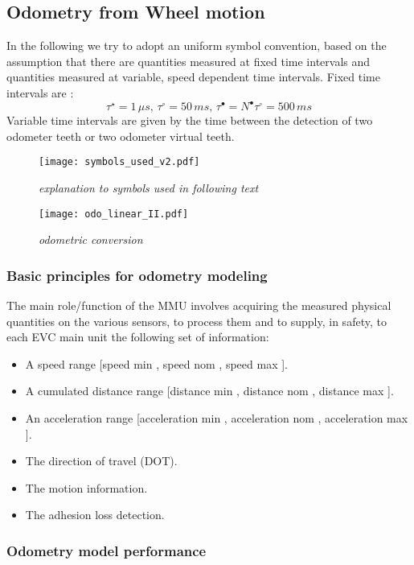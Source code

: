 \subsection{Odometry from Wheel motion}

In the following we try to adopt an uniform symbol convention, based on the assumption that there are quantities measured at fixed time intervals and quantities measured at variable, speed dependent time intervals. Fixed time intervals are :
\begin{equation}
\tau^\star =1\, \mu s ,\,
\tau^\circ = 50 \,ms, \,
\tau^\bullet = N^\bullet \tau^\circ = 500\, ms
\end{equation}
Variable time intervals are given by the time between the detection of two odometer teeth or two odometer virtual teeth.

\begin{figure}[!ht]
\centerline{
\texttt{[image: symbols\_used\_v2.pdf]}
}
\caption{\emph{explanation to symbols used in following text}}
\label {fig:symbolu}
\end{figure}
\begin{figure}[!ht]
\centerline{
\texttt{[image: odo\_linear\_II.pdf]}
}
\caption{\emph{odometric conversion}}
\label {fig:odoconv}
\end{figure}
\subsubsection{Basic principles for odometry modeling}
The main role/function of the \gls{MMU}  involves acquiring the measured physical quantities on the various sensors, to process
them and to supply, in safety, to each EVC main unit the following set of information:
\begin{itemize}
\item A speed range [speed min , speed nom , speed max ].
\item A cumulated distance range [distance min , distance nom , distance max ].
\item An acceleration range [acceleration min , acceleration nom , acceleration max ].
\item The direction of travel (\gls{DOT}).
\item The motion information.
\item The adhesion loss detection.
\end{itemize}
\newpage
\subsubsection{Odometry model performance}

